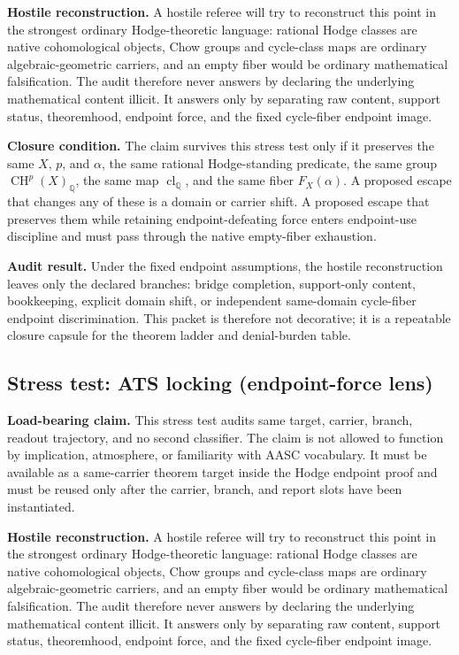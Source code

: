 \documentclass[11pt]{article}
\newcommand{\QQ}{\mathbb{Q}}
\newcommand{\CH}{\operatorname{CH}}
\newcommand{\clQ}{\operatorname{cl}_{\QQ}}
\begin{document}
\par\noindent\textbf{Hostile reconstruction.} A hostile referee will try to reconstruct this point in the strongest ordinary Hodge-theoretic language: rational Hodge classes are native cohomological objects, Chow groups and cycle-class maps are ordinary algebraic-geometric carriers, and an empty fiber would be ordinary mathematical falsification. The audit therefore never answers by declaring the underlying mathematical content illicit. It answers only by separating raw content, support status, theoremhood, endpoint force, and the fixed cycle-fiber endpoint image.

\par\noindent\textbf{Closure condition.} The claim survives this stress test only if it preserves the same $X$, $p$, and $\alpha$, the same rational Hodge-standing predicate, the same group $\CH^p(X)_\QQ$, the same map $\clQ$, and the same fiber $F_X(\alpha)$. A proposed escape that changes any of these is a domain or carrier shift. A proposed escape that preserves them while retaining endpoint-defeating force enters endpoint-use discipline and must pass through the native empty-fiber exhaustion.

\par\noindent\textbf{Audit result.} Under the fixed endpoint assumptions, the hostile reconstruction leaves only the declared branches: bridge completion, support-only content, bookkeeping, explicit domain shift, or independent same-domain cycle-fiber endpoint discrimination. This packet is therefore not decorative; it is a repeatable closure capsule for the theorem ladder and denial-burden table.


\subsection{Stress test: ATS locking (endpoint-force lens)}

\par\noindent\textbf{Load-bearing claim.} This stress test audits same target, carrier, branch, readout trajectory, and no second classifier. The claim is not allowed to function by implication, atmosphere, or familiarity with AASC vocabulary. It must be available as a same-carrier theorem target inside the Hodge endpoint proof and must be reused only after the carrier, branch, and report slots have been instantiated.

\par\noindent\textbf{Hostile reconstruction.} A hostile referee will try to reconstruct this point in the strongest ordinary Hodge-theoretic language: rational Hodge classes are native cohomological objects, Chow groups and cycle-class maps are ordinary algebraic-geometric carriers, and an empty fiber would be ordinary mathematical falsification. The audit therefore never answers by declaring the underlying mathematical content illicit. It answers only by separating raw content, support status, theoremhood, endpoint force, and the fixed cycle-fiber endpoint image.
\end{document}
